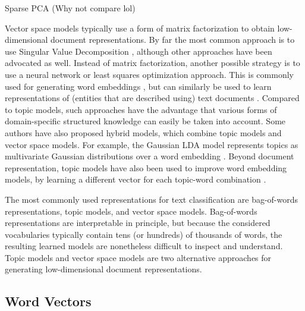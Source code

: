 \cite{Zhang2012} Sparse PCA (Why not compare lol)

Vector space models typically use a form of matrix factorization to obtain low-dimensional document representations. By far the most common approach is to use Singular Value Decomposition \cite{ASI:ASI1}, although other approaches have been advocated as well. 
Instead of matrix factorization, another possible strategy is to use a neural network or least squares optimization approach. This is commonly used for generating word embeddings \cite{DBLP:conf/nips/MikolovSCCD13,glove2014}, but can similarly be used to learn representations of (entities that are described using) text documents \cite{DBLP:journals/corr/DaiOL15,van2016learning,DBLP:conf/sigir/JameelBS17}. Compared to topic models, such approaches have the advantage that various forms of domain-specific structured knowledge can easily be taken into account. Some authors have also proposed hybrid models, which combine topic models and vector space models. For example, the Gaussian LDA model represents topics as multivariate Gaussian distributions over a word embedding \cite{DBLP:conf/acl/DasZD15}. Beyond document representation, topic models have also been used to improve word embedding models, by learning a different vector for each topic-word combination \cite{DBLP:conf/aaai/LiuLCS15}. %

The most commonly used representations for text classification are bag-of-words representations, topic models, and vector space models. Bag-of-words representations are interpretable in principle, but because the considered vocabularies typically contain tens (or hundreds) of thousands of words, the resulting learned models are nonetheless difficult to inspect and understand. Topic models and vector space models are two alternative approaches for generating low-dimensional document representations. %

\subsection{Word Vectors}
